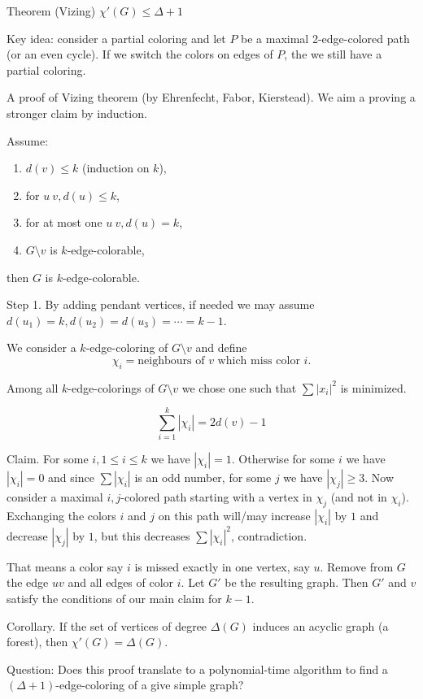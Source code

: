\documentclass[12pt,a4paper]{article}
\begin{document}
Theorem (Vizing) \(\chi'(G) \leq \Delta + 1\)

Key idea: consider a partial coloring and let \(P\) be a maximal 2-edge-colored
path (or an even cycle). If we switch the colors on edges of \(P\), the we still
have a partial coloring.

A proof of Vizing theorem (by Ehrenfecht, Fabor, Kierstead).  We aim a proving a
stronger claim by induction.

Assume: \begin{enumerate}
\item \(d(v) \leq k\) (induction on \(k\)),
\item for \(u ~ v, d(u) \leq k\),
\item for at most one \(u ~ v, d(u) = k\),
\item \(G \setminus v\) is \(k\)-edge-colorable,
\end{enumerate} then \(G\) is \(k\)-edge-colorable.

Step 1. By adding pendant vertices, if needed we may assume \(d(u_1) = k, d(u_2)
= d(u_3) =\cdots = k - 1\).

We consider a \(k\)-edge-coloring of \(G \setminus v\) and define
\[\chi_i = {\text{neighbours of } v \text{ which miss color } i}.\]

Among all \(k\)-edge-colorings of \(G\setminus v\) we chose one such that
\(\sum{|x_i|}^2\) is minimized.

\[\sum_{i=1}^k|\chi_i| = 2d(v)-1\]

Claim. For some \(i, 1 \leq i \leq k\) we have \(|\chi_i| = 1\). Otherwise for
some \(i\) we have \(|\chi_i| = 0\) and since \(\sum|\chi_i|\) is an odd number,
for some \(j\) we have \(|\chi_j| \geq 3\). Now consider a maximal
\({i, j}\)-colored path starting with a vertex in \(\chi_j\) (and not in
\(\chi_i\)).  Exchanging the colors \(i\) and \(j\) on this path will/may
increase \(|\chi_i|\) by \(1\) and decrease \(|\chi_j|\) by \(1\), but this
decreases \(\sum{|\chi_i|}^2\), contradiction.

That means a color say \(i\) is missed exactly in one vertex, say \(u\). Remove
from \(G\) the edge \(u v\) and all edges of color \(i\). Let \(G'\) be the
resulting graph. Then \(G'\) and \(v\) satisfy the conditions of our main claim
for \(k-1\).

Corollary. If the set of vertices of degree \(\Delta(G)\) induces an acyclic
graph (a forest), then \(\chi'(G) = \Delta(G)\).

Question: Does this proof translate to a polynomial-time algorithm to find a
\((\Delta + 1)\)-edge-coloring of a give simple graph?
\end{document}
